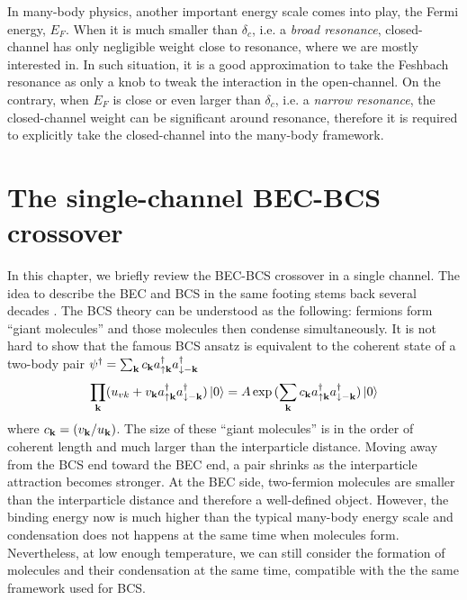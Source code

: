In many-body physics, another important energy scale comes into play, the Fermi energy, $E_{F}$.  When it is much smaller than $\delta_{c}$, i.e. a \emph{broad resonance},  closed-channel has only negligible weight close to resonance, where we are mostly interested in. In such situation, it is a good approximation to take the Feshbach resonance as only a knob to tweak the interaction in the open-channel.  On the contrary, when $E_{F}$ is close or even larger than $\delta_{c}$, i.e. a \emph{narrow resonance}, the closed-channel weight can be  significant around resonance, therefore it is required to explicitly take the closed-channel into the many-body framework.  










\chapter{The single-channel BEC-BCS crossover\label{sec:intro:1channel}}
In this chapter, we briefly review the BEC-BCS crossover in a single channel.   The idea to describe the BEC and BCS in the same footing stems back several decades \cite{Eagle, LeggettCrossover, Nozieres, RanderiaBEC}.  %
The BCS theory can be understood as the following: fermions form  ``giant molecules'' and those molecules then condense simultaneously.    It is not hard to show that the famous BCS ansatz is equivalent to  the  coherent state of a two-body pair $\psi^{\dagger}=\sum_{\mathbf{k}}c_{\mathbf{k}}a^{\dagger}_{\uparrow\mathbf{k}}a^{\dagger}_{\downarrow-\mathbf{k}}$
\begin{equation}\label{eq:intro:BCScoherent}
\prod_{\mathbf{k}}(u_{vk}+v_{\mathbf{k}}a^{\dagger}_{\uparrow\mathbf{k}}a^{\dagger}_{\downarrow-\mathbf{k}})\left|0\right>=A\exp{}(\sum_{\mathbf{k}}c_{\mathbf{k}}a^{\dagger}_{\uparrow\mathbf{k}}a^{\dagger}_{\downarrow-\mathbf{k}})\left|0\right>
\end{equation}
where $c_{\mathbf{k}}=( v_{\mathbf{k}}/u_{\mathbf{k}})$. The size of these ``giant molecules'' is in the order of coherent length and much larger than the interparticle distance.
Moving away from the BCS end toward the BEC end, a pair shrinks as the interparticle attraction becomes stronger.  At the BEC side, two-fermion molecules are smaller than the interparticle distance and therefore a well-defined object. However, the binding energy now is much higher than the typical many-body energy scale and condensation does not happens at the same time when molecules form.  Nevertheless,  at low enough temperature, we can still consider the formation of molecules and their condensation  at the same time, compatible with the  the same framework used for BCS.  

